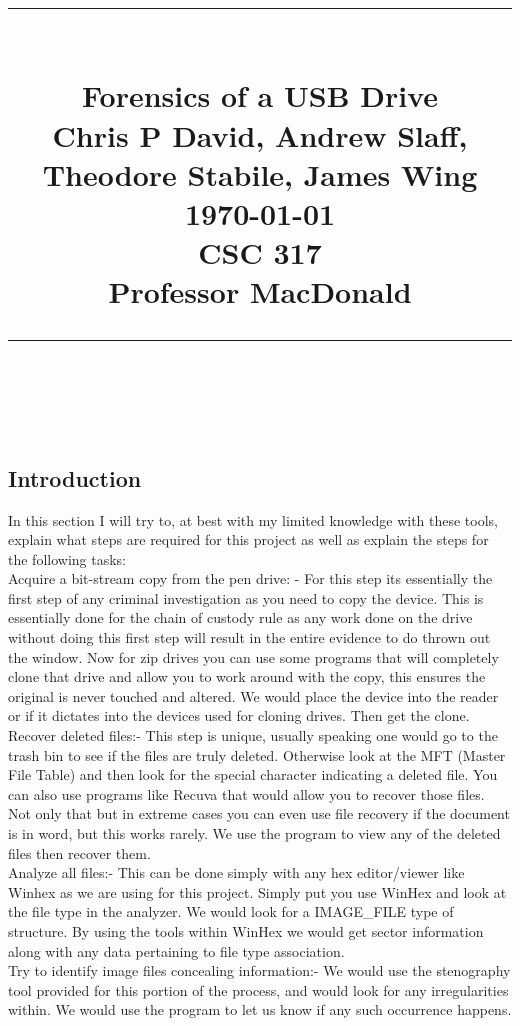 \documentclass[12ptletterpaper]{paper}
\title{
	\begin{center}
		\normalfont \normalsize
		\rule{\linewidth}{.5pt} \\[0.4cm] 
		\huge {Forensics of a USB Drive} \\ 
		\small{Chris P David, Andrew Slaff, Theodore Stabile, James Wing}\\
		{\today}\\
		{CSC 317}\\
		{Professor MacDonald}
		\rule{\linewidth}{.5pt} \\
	\end{center}
}
\newcommand\tab[1][1cm]{\hspace*{#1}}
\begin{document}
	\begin{titlepage}
		\clearpage
		\maketitle
		\thispagestyle{empty}
	\end{titlepage}
	\pagebreak	
	\tableofcontents
	\begin{flushleft}
		\pagebreak
		\section{Introduction}
		\tab In this section I will try to, at best with my limited knowledge with these tools, explain what steps are required for this project as well as explain the steps for the following tasks:\\
		\tab Acquire a bit-stream copy from the pen drive: - For this step its essentially the first step of any criminal investigation as you need to copy the device. This is essentially done for the chain of custody rule as any work done on the drive without doing this first step will result in the entire evidence to do thrown out the window. Now for zip drives you can use some programs that will completely clone that drive and allow you to work around with the copy, this ensures the original is never touched and altered. We would place the device into the reader or if it dictates into the devices used for cloning drives. Then get the clone.\\
		\tab Recover deleted files:- This step is unique, usually speaking one would go to the trash bin to see if the files are truly deleted. Otherwise look at the MFT (Master File Table) and then look for the special character indicating a deleted file. You can also use programs like Recuva that would allow you to recover those files. Not only that but in extreme cases you can even use file recovery if the document is in word, but this works rarely. We use the program to view any of the deleted files then recover them.\\
		\tab Analyze all files:- This can be done simply with any hex editor/viewer like Winhex as we are using for this project. Simply put you use WinHex and look at the file type in the analyzer. We would look for a IMAGE\_FILE type of structure. By using the tools within WinHex we would get sector information along with any data pertaining to file type association.\\
		\tab Try to identify image files concealing information:- We would use the stenography tool provided for this portion of the process, and would look for any irregularities within. We would use the program to let us know if any such occurrence happens.\\

\end{flushleft}
\end{document}
